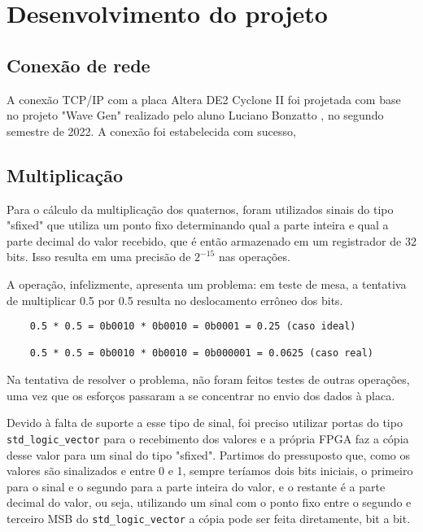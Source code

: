 \documentclass [12pt,oneside] {article}
\begin{document}
\newpage

\section{Desenvolvimento do projeto}

\subsection{Conexão de rede}

	A conexão TCP/IP com a placa Altera DE2 Cyclone II foi
projetada com base no projeto "Wave Gen" realizado pelo aluno Luciano Bonzatto
, no segundo semestre de 2022. A conexão foi estabelecida com sucesso,

\subsection{Multiplicação}

	Para o cálculo da multiplicação dos quaternos, foram
utilizados sinais do tipo "sfixed" que utiliza um ponto fixo
determinando qual a parte inteira e qual a parte decimal do valor
recebido, que é então armazenado em um registrador de 32 bits. Isso
resulta em uma precisão de $2^{-15}$ nas operações.

	A operação, infelizmente, apresenta um problema: em teste de
mesa, a tentativa de multiplicar 0.5 por 0.5 resulta no deslocamento
errôneo dos bits.

\begin{footnotesize}
\begin{verbatim}
	0.5 * 0.5 = 0b0010 * 0b0010 = 0b0001 = 0.25 (caso ideal)

	0.5 * 0.5 = 0b0010 * 0b0010 = 0b000001 = 0.0625 (caso real)
\end{verbatim}
\end{footnotesize}

Na tentativa de resolver o problema, não foram feitos testes de outras
operações, uma vez que os esforços passaram a se concentrar no envio
dos dados à placa.

	Devido à falta de suporte a esse tipo de sinal, foi preciso
utilizar portas do tipo \texttt{std\_logic\_vector} para o recebimento dos
valores e a própria FPGA faz a cópia desse valor para um sinal do tipo
"sfixed". Partimos do pressuposto que, como os valores são sinalizados
e entre 0 e 1, sempre teríamos dois bits iniciais, o primeiro para o
sinal e o segundo para a parte inteira do valor, e o restante é a
parte decimal do valor, ou seja, utilizando um sinal com o ponto fixo
entre o segundo e terceiro MSB do \texttt{std\_logic\_vector} a cópia pode ser
feita diretamente, bit a bit.
\end{document}
